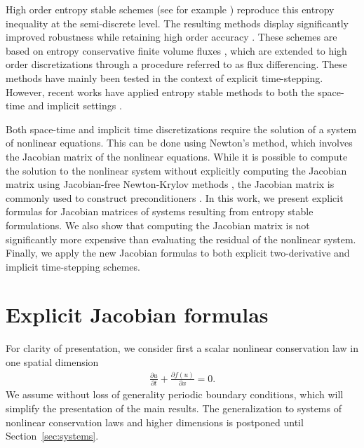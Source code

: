 \documentclass{article}
\newcommand{\pd}[2]{\frac{\partial#1}{\partial#2}}
\newcommand{\LRp}[1]{\left( #1 \right)}
\newcommand{\note}[1]{{\color{blue}{#1}}}
\newcommand{\eqlab}[1]{\begin{align}#1\end{align}}
\begin{document}
High order entropy stable schemes (see for example \cite{carpenter2014entropy, gassner2016split, chen2017entropy, crean2018entropy, chan2017discretely}) reproduce this entropy inequality at the semi-discrete level.  The resulting methods display significantly improved robustness while retaining high order accuracy \cite{winters2018comparative, rojas2019robustness}.  These schemes are based on entropy conservative finite volume fluxes \cite{tadmor1987numerical}, which are extended to high order discretizations through a procedure referred to as flux differencing.  These methods have mainly been tested in the context of explicit time-stepping.  However, recent works have applied entropy stable methods to both the space-time and implicit settings \cite{friedrich2018entropy, hicken2020entropy}.  

Both space-time and implicit time discretizations require the solution of a system of nonlinear equations.  This can be done using Newton's method, which involves the Jacobian matrix of the nonlinear equations.  While it is possible to compute the solution to the nonlinear system without explicitly computing the Jacobian matrix using Jacobian-free Newton-Krylov methods \cite{knoll2004jacobian, birken2019subcell}, the Jacobian matrix is commonly used to construct preconditioners \cite{persson2008newton}.  In this work, we present explicit formulas for Jacobian matrices of systems resulting from entropy stable formulations.  We also show that computing the Jacobian matrix is not significantly more expensive than evaluating the residual of the nonlinear system.  Finally, we apply the new Jacobian formulas to both explicit two-derivative and implicit time-stepping schemes.


\section{Explicit Jacobian formulas}

For clarity of presentation, we consider first a scalar nonlinear conservation law in one spatial dimension
\eqlab{
\pd{u}{t} + \pd{f(u)}{x} = 0. \label{eq:ncl}
}
We assume without loss of generality periodic boundary conditions, which will simplify the presentation of the main results.  
The generalization to systems of nonlinear conservation laws and higher dimensions is postponed until Section~\ref{sec:systems}.  
\end{document}
